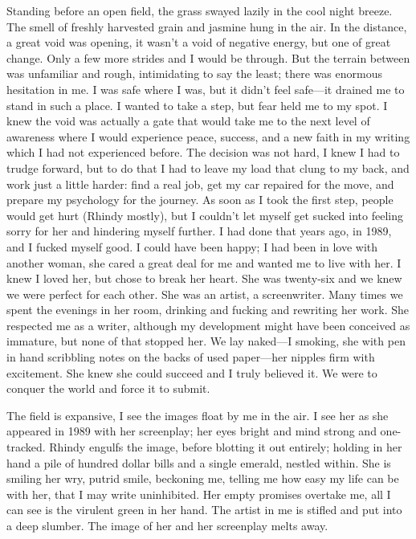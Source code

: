 Standing before an open field, the grass swayed lazily in the cool night
breeze. The smell of freshly harvested grain and jasmine hung in the
air. In the distance, a great void was opening, it wasn't a void of
negative energy, but one of great change. Only a few more strides and I
would be through. But the terrain between was unfamiliar and rough,
intimidating to say the least; there was enormous hesitation in me. I
was safe where I was, but it didn't feel safe---it drained me to stand
in such a place. I wanted to take a step, but fear held me to my spot. I
knew the void was actually a gate that would take me to the next level
of awareness where I would experience peace, success, and a new faith in
my writing which I had not experienced before. The decision was not
hard, I knew I had to trudge forward, but to do that I had to leave my
load that clung to my back, and work just a little harder: find a real
job, get my car repaired for the move, and prepare my psychology for the
journey. As soon as I took the first step, people would get hurt (Rhindy
mostly), but I couldn't let myself get sucked into feeling sorry for her
and hindering myself further. I had done that years ago, in 1989, and I
fucked myself good. I could have been happy; I had been in love with
another woman, she cared a great deal for me and wanted me to live with
her. I knew I loved her, but chose to break her heart. She was
twenty-six and we knew we were perfect for each other. She was an
artist, a screenwriter. Many times we spent the evenings in her room,
drinking and fucking and rewriting her work. She respected me as a
writer, although my development might have been conceived as immature,
but none of that stopped her. We lay naked---I smoking, she with pen in
hand scribbling notes on the backs of used paper---her nipples firm with
excitement. She knew she could succeed and I truly believed it. We were
to conquer the world and force it to submit.

The field is expansive, I see the images float by me in the air. I see
her as she appeared in 1989 with her screenplay; her eyes bright and
mind strong and one-tracked. Rhindy engulfs the image, before blotting
it out entirely; holding in her hand a pile of hundred dollar bills and
a single emerald, nestled within. She is smiling her wry, putrid smile,
beckoning me, telling me how easy my life can be with her, that I may
write uninhibited. Her empty promises overtake me, all I can see is the
virulent green in her hand. The artist in me is stifled and put into a
deep slumber. The image of her and her screenplay melts away.

